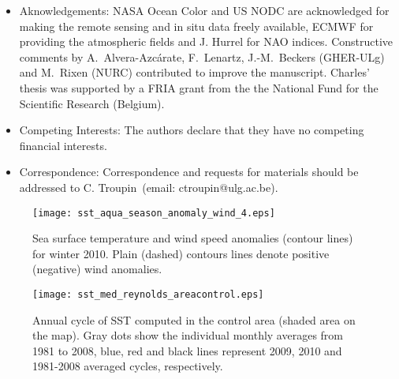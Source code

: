 \documentclass[12pt]{article}
\begin{document}





\begin{itemize}
 \item Aknowledgements: NASA Ocean Color and US NODC are acknowledged for making the remote sensing and in situ data freely available, ECMWF for providing the atmospheric fields and J. Hurrel for NAO indices. Constructive comments by A.~Alvera-Azc\'{a}rate, F.~Lenartz, J.-M.~Beckers (GHER-ULg) and M.~Rixen (NURC) contributed to improve the manuscript. Charles' thesis was supported by a FRIA grant from the the National Fund for the Scientific Research (Belgium).
 
 \item Competing Interests: The authors declare that they have no
competing financial interests.

 \item Correspondence: Correspondence and requests for materials
should be addressed to C. Troupin~(email: ctroupin@ulg.ac.be).

\end{itemize}


\begin{figure}[H]
\centering
\texttt{[image: sst\_aqua\_season\_anomaly\_wind\_4.eps]}
\caption{Sea surface temperature and wind speed anomalies (contour lines) for winter 2010. Plain (dashed) contours lines denote positive (negative) wind anomalies.\label{fig:sst_aqua_season_anomaly_wind_4}}
\end{figure}

\begin{figure}[H]
\centering
\texttt{[image: sst\_med\_reynolds\_areacontrol.eps]}
\caption{Annual cycle of SST computed in the control area (shaded area on the map). Gray dots show the individual monthly averages from 1981 to 2008, blue, red and black lines represent 2009, 2010 and 1981-2008 averaged cycles, respectively.\label{fig:sst_med_reynolds_areacontrol}}
\end{figure}
\end{document}
